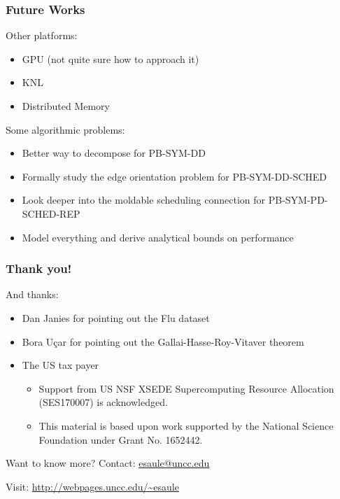 \documentclass{beamer}
\begin{document}
\begin{frame}
  \frametitle{Future Works}

  Other platforms:
  \begin{itemize}
  \item GPU (not quite sure how to approach it)
  \item KNL
  \item Distributed Memory
  \end{itemize}

  Some algorithmic problems:
  \begin{itemize}
  \item Better way to decompose for \textsc{PB-SYM-DD}
  \item Formally study the edge orientation problem for \textsc{PB-SYM-DD-SCHED}
  \item Look deeper into the moldable scheduling connection for \textsc{PB-SYM-PD-SCHED-REP}
  \item Model everything and derive analytical bounds on performance
  \end{itemize}
\end{frame}



\begin{frame}
  \frametitle{Thank you!}

  And thanks:
  \begin{itemize}
  \item Dan Janies for pointing out the Flu dataset
  \item Bora U\c{c}ar for pointing out the Gallai-Hasse-Roy-Vitaver theorem
  \item The US tax payer
    \begin{itemize}
    \item Support from US NSF XSEDE Supercomputing Resource Allocation (SES170007) is acknowledged.
    \item This material is based upon work supported by the National Science Foundation under Grant No. 1652442.
    \end{itemize}
  \end{itemize}

  \begin{block}{Want to know more?}
    Contact: \url{esaule@uncc.edu}

    Visit: \url{http://webpages.uncc.edu/~esaule}
  \end{block}
\end{frame}



\end{document}

